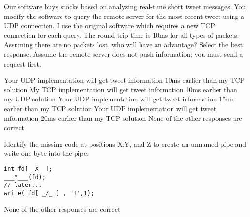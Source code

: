 \variant
Our software buys stocks based on analyzing real-time short tweet messages. You modify the software to query the remote server for the most recent tweet using a UDP connection. I use the original software which requires a new TCP connection for each query. The round-trip time is 10ms for all types of packets. Assuming there are no packets lost, who will have an advantage? Select the best response. Assume the remote server does not push information; you must send a request first.
\begin{answers}
\correctanswer Your UDP implementation will get tweet information 10ms earlier than my TCP solution
\answer My TCP implementation will get tweet information 10ms earlier than my UDP solution
\answer Your UDP implementation will get tweet information 15ms earlier than my TCP solution
\answer Your UDP implementation will get tweet information 20ms earlier than my TCP solution
\answer None of the other responses are correct
\end{answers}
\begin{solution}
\end{solution}


\variant
Identify the missing code at positions X,Y, and Z to create an unnamed pipe and write one byte into the pipe. 
\begin{verbatim}
int fd[ _X_ ];
___Y___(fd);
// later...
write( fd[ _Z_ ] , "!",1);
\end{verbatim}

\begin{answers}
\answer None of the other responses are correct
\end{answers}
\begin{solution}
\end{solution}

\zone

